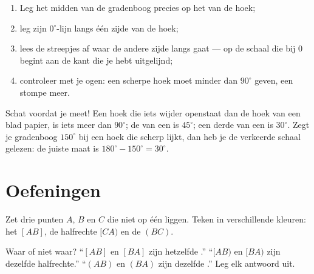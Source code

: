 \begin{method}\label{met:g6:lines:protractor}
\begin{enumerate}
  \item Leg het midden van de gradenboog precies op het  van de hoek;
  \item leg zijn $0^\circ$-lijn langs één zijde van de hoek;
  \item lees de streepjes af waar de andere zijde langs gaat --- op de schaal
        die bij $0$ begint aan de kant die je hebt uitgelijnd;
  \item controleer met je ogen: een scherpe hoek moet minder dan $90^\circ$
        geven, een stompe meer.
\end{enumerate}
\end{method}

\begin{example}\label{ex:g6:lines:estimate}
Schat voordat je meet! Een hoek die iets wijder openstaat dan de hoek van een
blad papier, is iets meer dan $90^\circ$; de  van een  is
$45^\circ$; een derde van een  is $30^\circ$. Zegt je gradenboog
$150^\circ$ bij een hoek die scherp lijkt, dan heb je de verkeerde schaal
gelezen: de juiste maat is $180^\circ - 150^\circ = 30^\circ$.
\end{example}

\section{Oefeningen}

\begin{exercise}[$\star$]\label{exo:g6:lines:1}
Zet drie punten $A$, $B$ en $C$ die niet op één  liggen. Teken in
verschillende kleuren: het  $[AB]$, de halfrechte $[CA)$ en de 
$(BC)$.
\end{exercise}

\begin{exercise}[$\star$]\label{exo:g6:lines:2}
Waar of niet waar? ``$[AB]$ en $[BA]$ zijn hetzelfde .'' ``$[AB)$ en
$[BA)$ zijn dezelfde halfrechte.'' ``$(AB)$ en $(BA)$ zijn dezelfde .''
Leg elk antwoord uit.
\end{exercise}

